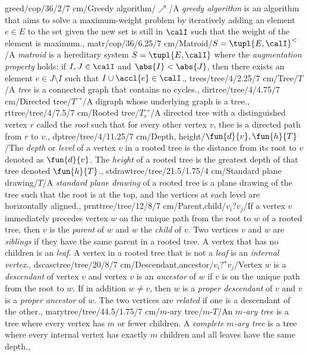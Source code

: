greed/cop/36/2/7 cm/{Greedy algorithm}/{\textdollaroldstyle$\nearrow$}/{A \emph{greedy algorithm} is an algorithm that aims to solve a maximum-weight problem by iteratively adding an element $e\in E$ to the set given the new set is still in $\calI$ such that the weight of the element is maximum.},%
matr/cop/36/6.25/7 cm/{Matroid}/{$S=\tupl{E,\calI}^{<}$}/{A \emph{matroid} is a hereditary system $S=\tupl{E,\calI}$ where the \emph{augmentation property} holds: if $I,J\in\calI$ and $\abs{I}<\abs{J}$, then there exists an element $e\in J\setminus I$ such that $I\cup\accl{e}\in\calI$.},
trees/tree/4/2.25/7 cm/Tree/$T$/{A \emph{tree} is a connected graph that contains no cycles.},%
dirtree/tree/4/4.75/7 cm/{Directed tree}/{$T^{\rightarrow}$}/{A digraph whose underlying graph is a tree.},%
rttree/tree/4/7.5/7 cm/{Rooted tree}/{$T^{\rightarrow}_r$}/{A directed tree with a distinguished vertex $r$ called the \emph{root} such that for every other vertex $v$, thee is a directed path from $r$ to $v$.},%
dptree/tree/4/11.25/7 cm/{Depth, height}/{$\fun{d}{v},\fun{h}{T}$}/{The \emph{depth} or \emph{level} of a vertex $v$ in a rooted tree is the distance from its root to $v$ denoted as $\fun{d}{v}$. The \emph{height} of a rooted tree is the greatest depth of that tree denoted $\fun{h}{T}$.},%
stdrawtree/tree/21.5/1.75/4 cm/{Standard plane drawing}/{\smallpencil $T$}/{A \emph{standard plane drawing} of a rooted tree is a plane drawing of the tree such that the root is at the top, and the vertices at each level are horizontally aligned.},%
prnttree/tree/12/8/7 cm/{Parent,child}/{$v_i ? v_j$}/{If a vertex $v$ immediately precedes vertex $w$ on the unique path from the root to $w$ of a rooted tree, then $v$ is the \emph{parent} of $w$ and $w$ the \emph{child} of $v$. Two vertices $v$ and $w$ are \emph{siblings} if they have the same parent in a rooted tree. A vertex that has no children is an \emph{leaf}. A vertex in a rooted tree that is not a \emph{leaf} is an \emph{internal vertex}.},%
dscasctree/tree/20/8/7 cm/{Descendant,ancestor}/{$v_i ?^{\star} v_j$}/{Vertex $w$ is a \emph{descendant} of vertex $v$ and vertex $v$ is an \emph{ancestor} of $w$ if $v$ is on the unique path from the root to $w$. If in addition $w\neq v$, then $w$ is a \emph{proper descendant} of $v$ and $v$ is a \emph{proper ancestor} of $w$. The two vertices are \emph{related} if one is a descendant of the other.},%
marytree/tree/44.5/1.75/7 cm/{$m$-ary tree}/{$m$-$T$}/{An \emph{$m$-ary tree} is a tree where every vertex has $m$ or fewer children. A \emph{complete $m$-ary tree} is a tree where every internal vertex has exactly $m$ children and all leaves have the same depth.},%
